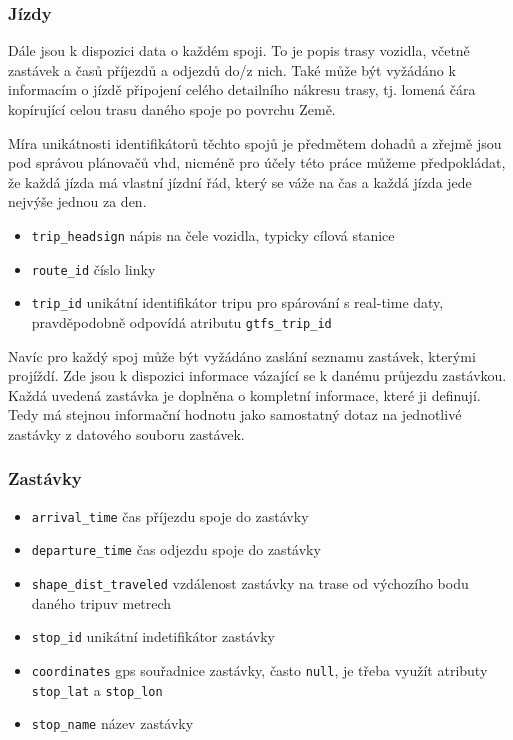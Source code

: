 \subsubsection{Jízdy}

Dále jsou k dispozici data o každém spoji. To je popis trasy vozidla, včetně zastávek a časů příjezdů a odjezdů do/z nich. Také může být vyžádáno k informacím o jízdě připojení celého detailního nákresu trasy, tj. lomená čára kopírující celou trasu daného spoje po povrchu Země.

\bigbreak

Míra unikátnosti identifikátorů těchto spojů je předmětem dohadů a zřejmě jsou pod správou plánovačů \gls{vhd}, nicméně pro účely této práce můžeme předpokládat, že každá jízda má vlastní jízdní řád, který se váže na čas a každá jízda jede nejvýše jednou za den.

\begin{itemize}
	\item \verb-trip_headsign- nápis na čele vozidla, typicky cílová stanice

	\item \verb-route_id- číslo linky

	\item \verb-trip_id- unikátní identifikátor tripu pro spárování s real-time daty, pravděpodobně odpovídá atributu \verb"gtfs_trip_id"


\end{itemize}

Navíc pro každý spoj může být vyžádáno zaslání seznamu zastávek, kterými projíždí. Zde jsou k dispozici informace vázající se k danému průjezdu zastávkou. Každá uvedená zastávka je doplněna o kompletní informace, které ji definují. Tedy má stejnou informační hodnotu jako samostatný dotaz na jednotlivé zastávky z datového souboru zastávek.

\subsubsection{Zastávky}

\begin{itemize}
	\item \verb-arrival_time- čas příjezdu spoje do zastávky

	\item \verb-departure_time- čas odjezdu spoje do zastávky

	\item \verb-shape_dist_traveled- vzdálenost zastávky na trase od výchozího bodu daného tripuv metrech

	\item \verb-stop_id- unikátní indetifikátor zastávky

	\item \verb-coordinates- \gls{gps} souřadnice zastávky, často \verb"null", je třeba využít atributy \verb"stop_lat" a \verb"stop_lon"

	\item \verb-stop_name- název zastávky
\end{itemize}

